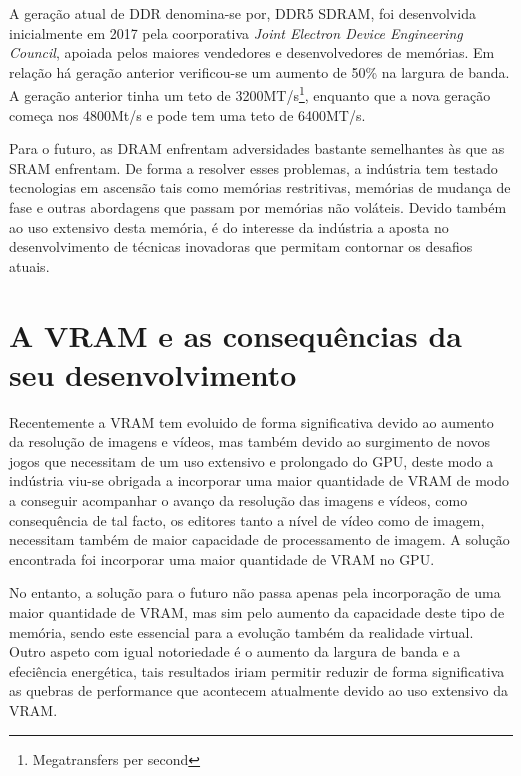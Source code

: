 \documentclass{report}
\begin{document}
\par A geração atual de \ac{DDR} denomina-se por, DDR5 SDRAM, foi desenvolvida inicialmente em 2017 pela coorporativa \textit{Joint Electron Device Engineering Council}, apoiada pelos maiores vendedores e desenvolvedores de memórias. Em relação há geração anterior verificou-se um aumento de 50\% na largura de banda. A geração anterior tinha um teto de 3200MT/s\footnote{Megatransfers per second}, enquanto que a nova geração começa nos 4800Mt/s e pode tem uma teto de 6400MT/s.
\par Para o futuro, as \ac{DRAM} enfrentam adversidades bastante semelhantes às que as \ac{SRAM} enfrentam. De forma a resolver esses problemas, a indústria tem testado tecnologias em ascensão tais como memórias restritivas, memórias de mudança de fase e outras abordagens que passam por memórias não voláteis. Devido também ao uso extensivo desta memória, é do interesse da indústria a aposta no desenvolvimento de técnicas inovadoras que permitam contornar os desafios atuais.

\section{A \ac{VRAM} e as consequências da seu desenvolvimento}

\par Recentemente a \ac{VRAM} tem evoluido de forma significativa devido ao aumento da resolução de imagens e vídeos, mas também devido ao surgimento de novos jogos que necessitam de um uso extensivo e prolongado do \ac{GPU}, deste modo a indústria viu-se obrigada a incorporar uma maior quantidade de \ac{VRAM} de modo a conseguir acompanhar o avanço da resolução das imagens e vídeos, como consequência de tal facto, os editores tanto a nível de vídeo como de imagem, necessitam também de maior capacidade de processamento de imagem. A solução encontrada foi incorporar uma maior quantidade de \ac{VRAM} no \ac{GPU}.

\par No entanto, a solução para o futuro não passa apenas pela incorporação de uma maior quantidade de \ac{VRAM}, mas sim pelo aumento da capacidade deste tipo de memória, sendo este essencial para a evolução também da realidade virtual. Outro aspeto com igual notoriedade é o aumento da largura de banda e a efeciência energética, tais resultados iriam permitir reduzir de forma significativa as quebras de performance que acontecem atualmente devido ao uso extensivo da \ac{VRAM}.
\end{document}
